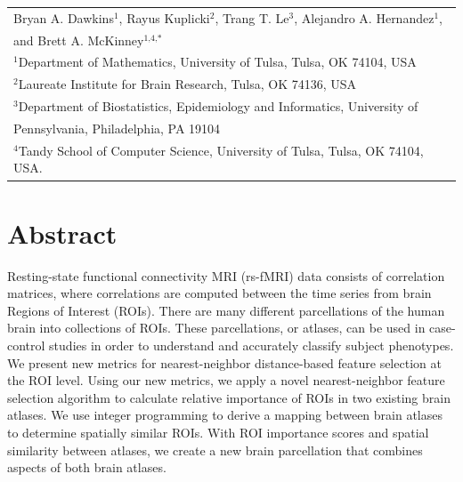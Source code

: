 \documentclass[10pt,letterpaper]{article}\usepackage[]{graphicx}\usepackage[]{color}
\begin{document}
\vspace*{0.2in}

{\Large
\textbf{} %
}
\begin{center}
  \begin{tabular}{l}
  Bryan A. Dawkins$^{\text{1}}$, Rayus Kuplicki$^{\text{2}}$, Trang T. Le$^{\text{3}}$, Alejandro A. Hernandez$^{\text{1}}$, \\
  and Brett A. McKinney$^{\text{1,4,}*}$ \\
  $^{\text{1}}$Department of Mathematics, University of Tulsa, Tulsa, OK 74104, USA \\
  $^{\text{2}}$Laureate Institute for Brain Research, Tulsa, OK 74136, USA \\
  $^{\text{3}}$Department of Biostatistics, Epidemiology and Informatics, University of \\
  \hphantom{2}Pennsylvania, Philadelphia, PA 19104 \\
  $^{\text{4}}$Tandy School of Computer Science, University of Tulsa, Tulsa, OK 74104, USA.
  \end{tabular}
\end{center}


\section*{Abstract}
Resting-state functional connectivity MRI (rs-fMRI) data consists of correlation matrices, where correlations are computed between the time series from brain Regions of Interest (ROIs). There are many different parcellations of the human brain into collections of ROIs. These parcellations, or atlases, can be used in case-control studies in order to understand and accurately classify subject phenotypes. We present new metrics for nearest-neighbor distance-based feature selection at the ROI level. Using our new metrics, we apply a novel nearest-neighbor feature selection algorithm to calculate relative importance of ROIs in two existing brain atlases. We use integer programming to derive a mapping between brain atlases to determine spatially similar ROIs. With ROI importance scores and spatial similarity between atlases, we create a new brain parcellation that combines aspects of both brain atlases.
\linenumbers
\end{document}
